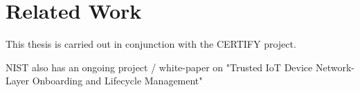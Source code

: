 \chapter{Related Work}

This thesis is carried out in conjunction with the CERTIFY project.

NIST also has an ongoing project / white-paper on "Trusted IoT Device Network-Layer Onboarding and Lifecycle Management"

